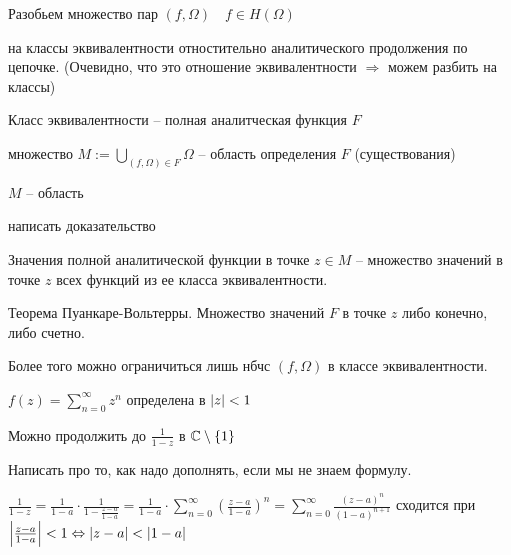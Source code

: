 \begin{definition}\thmslashn
	
	Разобьем множество пар $(f, \Omega)\quad f\in H(\Omega)$
	
	на классы эквивалентности отностительно аналитического продолжения по цепочке. (Очевидно, что это отношение эквивалентности $\Rightarrow$ можем разбить на классы)
	
	Класс эквивалентности -- полная аналитческая функция $F$ 
	
	множество $M := \bigcup_{(f, \Omega)\in F} \Omega$ -- область определения $F$ (существования)
	
\end{definition}

\begin{statement}\thmslashn
	
	$M$ -- область
	
\end{statement}

\TODO написать доказательство
	
\begin{definition}\thmslashn
	
	Значения полной аналитической функции в точке $z\in M$ -- множество значений в точке $z$ всех функций из ее класса эквивалентности.
	
\end{definition}

\begin{remark}\thmslashn
	
	Теорема Пуанкаре-Вольтерры. Множество значений $F$ в точке $z$ либо конечно, либо счетно.
	
	Более того можно ограничиться лишь нбчс $(f, \Omega)$ в классе эквивалентности.
	
\end{remark}

\begin{example}\thmslashn

	$f(z) = \sum\limits_{n=0}^{\infty} z^n$ определена в $\left|z\right| < 1$
	
	Можно продолжить до $\frac{1}{1-z}$ в $\mathbb{C}\setminus \{1\}$

	\TODO Написать про то, как надо дополнять, если мы не знаем формулу.

	$\frac{1}{1-z} = \frac{1}{1-a} \cdot \frac{1}{1-\frac{z-a}{1-a}} = \frac{1}{1-a} \cdot \sum\limits_{n=0}^{\infty}\left( \frac{z-a}{1-a} \right)^n = \sum\limits_{n=0}^{\infty}\frac{(z-a)^n}{(1-a)^{n+1}}$ сходится при $\left|\frac{z-a}{1-a}\right| < 1 \Leftrightarrow |z-a| < |1-a|$
	
\end{example}

